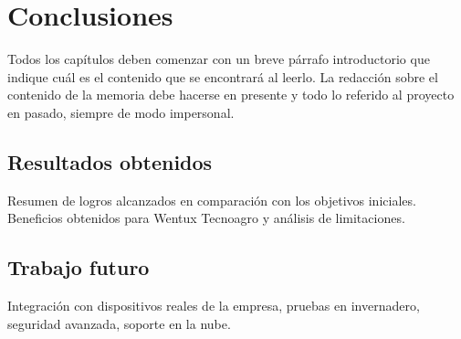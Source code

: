 
\chapter{Conclusiones} %

\label{Chapter5} %
Todos los capítulos deben comenzar con un breve párrafo introductorio que indique cuál es el contenido que se encontrará al leerlo.  La redacción sobre el contenido de la memoria debe hacerse en presente y todo lo referido al proyecto en pasado, siempre de modo impersonal.




\section{Resultados obtenidos}
Resumen de logros alcanzados en comparación con los objetivos iniciales. Beneficios obtenidos para Wentux Tecnoagro y análisis de limitaciones.

\section{Trabajo futuro}

Integración con dispositivos reales de la empresa, pruebas en invernadero, seguridad avanzada, soporte en la nube.
